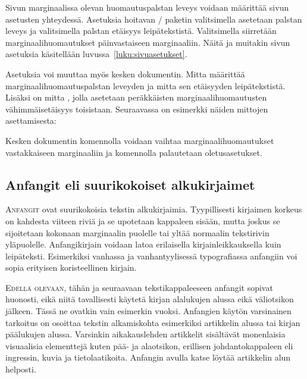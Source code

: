 Sivun marginaalissa olevan huomautuspalstan leveys voidaan määrittää
sivun asetusten yhteydessä. Asetuksia hoitavan \-/
paketin valitsimella  asetetaan palstan leveys ja
valitsimella  palstan etäisyys leipätekstistä.
Valitsimella  siirretään marginaalihuomautukset
päinvastaiseen marginaaliin. Näitä ja muitakin sivun asetuksia
käsitellään luvussa~\ref{luku:sivuasetukset}.

Asetuksia voi muuttaa myös kesken dokumentin. Mitta
 määrittää marginaalihuomautuspalstan leveyden ja
mitta  sen etäisyyden leipätekstistä. Lisäksi on
mitta , jolla asetetaan peräkkäisten
marginaalihuomautusten vähimmäisetäisyys toisistaan. Seuraavassa on
esimerkki näiden mittojen asettamisesta:

\begin{koodilohkosis}
  \setlength{\marginparwidth}{50bp}
  \setlength{\marginparsep}{10bp}
  \setlength{\marginparpush}{6bp}
\end{koodilohkosis}

Kesken dokumentin komennolla  voidaan vaihtaa
marginaalihuomautukset vastakkaiseen marginaaliin ja komennolla
 palautetaan oletusasetukset.

\subsection{Anfangit eli suurikokoiset alkukirjaimet}

\lettrine[lines=3, loversize=.06, lhang=.02, findent=-5bp, nindent=4bp,
slope=4bp]{A}{nfangit} ovat suurikokoisia tekstin alkukirjaimia.
Tyypillisesti kirjaimen korkeus on kahdesta viiteen riviä ja se
upotetaan kappaleen sisään, mutta joskus se sijoitetaan kokonaan
marginaalin puolelle tai yltää normaalin tekstirivin yläpuolelle.
Anfangikirjain voidaan latoa erilaisella kirjainleikkauksella kuin
leipäteksti. Esimerkiksi vanhassa ja vanhantyylisessä typografiassa
anfangiin voi sopia erityisen koristeellinen kirjain.

\smallskip

\lettrine[lines=2, lhang=1, nindent=0bp]{E\hspace{1.5bp}}{dellä
  olevaan}, tähän ja seuraavaan tekstikappaleeseen anfangit sopivat
huonosti, eikä niitä tavallisesti käytetä kirjan alalukujen alussa eikä
väliotsikon jälkeen. Tässä ne ovatkin vain esimerkin vuoksi. Anfangien
käytön varsinainen tarkoitus on osoittaa tekstin alkamiskohta
esimerkiksi artikkelin alussa tai kirjan päälukujen alussa. Varsinkin
aikakauslehden artikkelit sisältävät monenlaisia visuaalisia elementtejä
kuten pää- ja alaotsikon, erillisen johdantokappaleen eli ingressin,
kuvia ja tietolaatikoita. Anfangin avulla katse löytää artikkelin alun
helposti.

